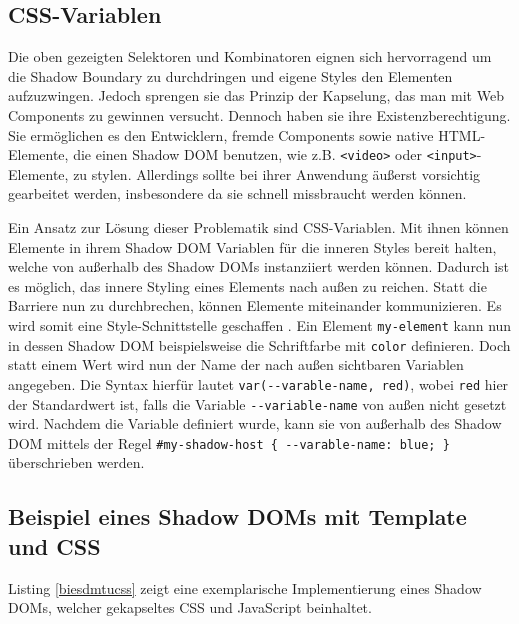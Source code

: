 \subsection{CSS-Variablen}\label{css-variablen}

Die oben gezeigten Selektoren und Kombinatoren eignen sich hervorragend um die Shadow Boundary zu durchdringen und eigene Styles den Elementen aufzuzwingen. Jedoch sprengen sie das Prinzip der Kapselung, das man mit Web Components zu gewinnen versucht. Dennoch haben sie ihre Existenzberechtigung. Sie ermöglichen es den Entwicklern, fremde Components sowie native \ac{HTML}-Elemente, die einen Shadow \ac{DOM} benutzen, wie z.B. \texttt{\textless{}video\textgreater{}} oder \texttt{\textless{}input\textgreater{}}-Elemente, zu stylen. Allerdings sollte bei ihrer Anwendung äußerst vorsichtig gearbeitet werden, insbesondere da sie schnell missbraucht werden können.

Ein Ansatz zur Lösung dieser Problematik sind \ac{CSS}-Variablen. Mit ihnen können Elemente in ihrem Shadow \ac{DOM} Variablen für die inneren Styles bereit halten, welche von außerhalb des Shadow \ac{DOM}s instanziiert werden können. Dadurch ist es möglich, das innere Styling eines Elements nach außen zu reichen. Statt die Barriere nun zu durchbrechen, können Elemente miteinander kommunizieren. Es wird somit eine Style-Schnittstelle geschaffen \cite{citeulike:13883381}. Ein Element \texttt{my-element} kann nun in dessen Shadow \ac{DOM} beispielsweise die Schriftfarbe mit \texttt{color} definieren. Doch statt einem Wert wird nun der Name der nach außen sichtbaren Variablen angegeben. Die Syntax hierfür lautet \texttt{var(-\/-varable-name,\ red)}, wobei \texttt{red} hier der Standardwert ist, falls die Variable \texttt{-\/-variable-name} von außen nicht gesetzt wird. Nachdem die Variable definiert wurde, kann sie von außerhalb des Shadow \ac{DOM} mittels der Regel \texttt{\#my-shadow-host\ \{\ -\/-varable-name:\ blue;\ \}} überschrieben werden.


\newpage
\subsection{Beispiel eines Shadow DOMs mit Template und CSS}\label{beispiel-eines-shadow-doms-mit-template-und-css}

Listing \ref{biesdmtucss} zeigt eine exemplarische Implementierung eines Shadow \ac{DOM}s, welcher gekapseltes \ac{CSS} und JavaScript beinhaltet.



